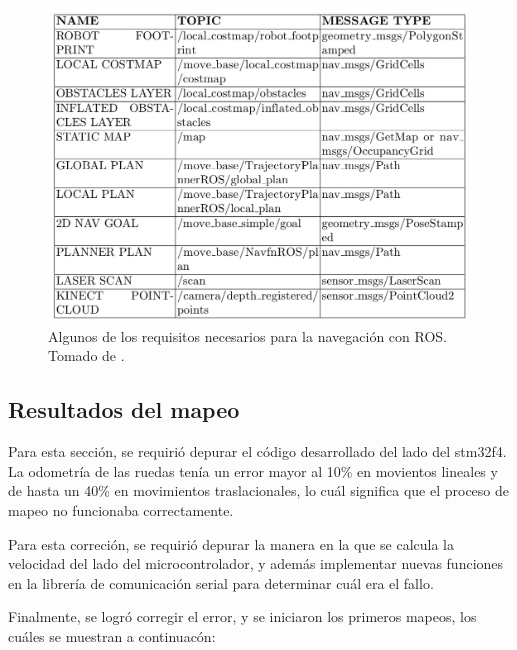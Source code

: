 \begin{figure}
\centering
\includegraphics[scale=0.3]{imagenes/tablarequisitos.png}
\caption{Algunos de los requisitos necesarios para la navegación con ROS. Tomado de \cite{Longhi}.}
\label{F:tablanavegacion}
\end{figure}


\subsection{Resultados del mapeo}

Para esta sección, se requirió depurar el código desarrollado del lado del
stm32f4. La odometría de las ruedas tenía un error mayor al 10\% en movientos
lineales y de hasta un 40\% en movimientos traslacionales, lo cuál significa
que el proceso de mapeo no funcionaba correctamente.

Para esta correción, se requirió depurar la manera en la que se calcula la
velocidad del lado del microcontrolador, y además implementar nuevas funciones
en la librería de comunicación serial para determinar cuál era el fallo.

Finalmente, se logró corregir el error, y se iniciaron los primeros mapeos, los
cuáles se muestran a continuacón:

